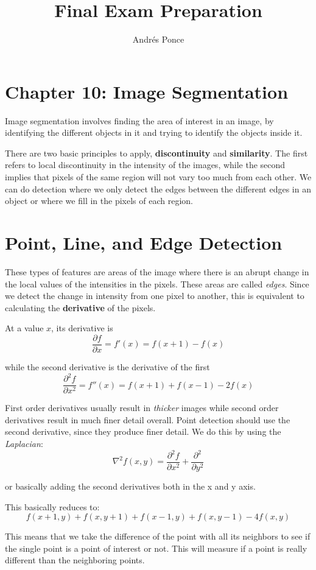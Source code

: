 \documentclass{tufte-handout}
\title{Final Exam Preparation}
\author{Andr\'es Ponce}
\begin{document}
\maketitle

\section{Chapter 10: Image Segmentation}
Image segmentation involves finding the area of interest in an image, by 
identifying the different objects in it and trying to identify the objects 
inside it.

There are two basic principles to apply, \textbf{discontinuity} and 
\textbf{similarity}. The first refers to local discontinuity in the intensity of the 
images, while the second implies that pixels of the same region will not 
vary too much from each other. We can do detection where we only detect the 
edges between the different edges in an object or where we fill in the pixels of 
each region.

\section{Point, Line, and Edge Detection}
These types of features are areas of the image where there is an abrupt change
in the local values of the intensities in the pixels. These areas are called 
\emph{edges}. Since we detect the change in intensity from one pixel to another, 
this is equivalent to calculating the \textbf{derivative} of the pixels.

At a value $x$, its derivative is 
\[\frac{\partial f}{\partial x} = f'(x) = f(x + 1) - f(x)\]

while the second derivative is the derivative of the first
\[\frac{\partial^{2}f}{\partial x^{2}} = f''(x) = f(x + 1) + f(x - 1) - 2f(x)\]

First order derivatives usually result in \emph{thicker} images while second order
derivatives result in much finer detail overall. Point detection should use the 
second derivative, since they produce finer detail. We do this by using the 
\emph{Laplacian}:
\[\nabla^{2}f(x, y) = \frac{\partial^{2}f}{\partial x^{2}} + \frac{\partial^{2}}{\partial y^{2}}\]

or basically adding the second derivatives both in the x and y axis.

This basically reduces to:
\[ f(x+1, y) + f(x, y+1) + f(x-1, y) + f(x, y-1) - 4f(x, y)\]

This means that we take the difference of the point with all its neighbors to see if the 
single point is a point of interest or not. This will measure if a point is really 
different than the neighboring points.
\end{document}
